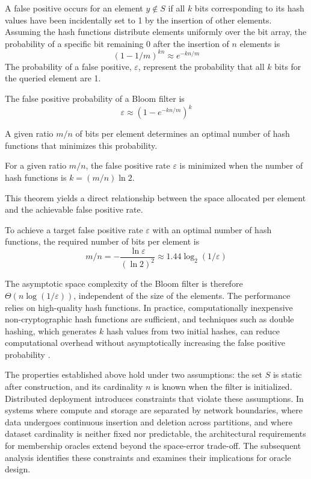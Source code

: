 A false positive occurs for an element $y \notin S$ if all $k$ bits corresponding to its hash values have been incidentally set to 1 by the insertion of other elements. Assuming the hash functions distribute elements uniformly over the bit array, the probability of a specific bit remaining 0 after the insertion of $n$ elements is
$$(1 - 1/m)^{kn} \approx e^{-kn/m}$$
The probability of a false positive, $\varepsilon$, represent the probability that all $k$ bits for the queried element are 1.

\begin{proposition}
    The false positive probability of a Bloom filter is
    $$\varepsilon \approx (1 - e^{-kn/m})^k$$
\end{proposition}

A given ratio $m/n$ of bits per element determines an optimal number of hash functions that minimizes this probability.

\begin{theorem}
    For a given ratio $m/n$, the false positive rate $\varepsilon$ is minimized when the number of hash functions is $k = (m/n) \ln 2$.
\end{theorem}

This theorem yields a direct relationship between the space allocated per element and the achievable false positive rate.

\begin{corollary}
    To achieve a target false positive rate $\varepsilon$ with an optimal number of hash functions, the required number of bits per element is
    $$m/n = -\frac{\ln \varepsilon}{(\ln 2)^2} \approx 1.44 \log_2(1/\varepsilon)$$
\end{corollary}

The asymptotic space complexity of the Bloom filter is therefore $\Theta(n \log(1/\varepsilon))$, independent of the size of the elements. The performance relies on high-quality hash functions. In practice, computationally inexpensive non-cryptographic hash functions are sufficient, and techniques such as double hashing, which generates $k$ hash values from two initial hashes, can reduce computational overhead without asymptotically increasing the false positive probability \cite{Tarkoma2012TheoryAP}.

The properties established above hold under two assumptions: the set $S$ is static after construction, and its cardinality $n$ is known when the filter is initialized. Distributed deployment introduces constraints that violate these assumptions. In systems where compute and storage are separated by network boundaries, where data undergoes continuous insertion and deletion across partitions, and where dataset cardinality is neither fixed nor predictable, the architectural requirements for membership oracles extend beyond the space-error trade-off. The subsequent analysis identifies these constraints and examines their implications for oracle design.

